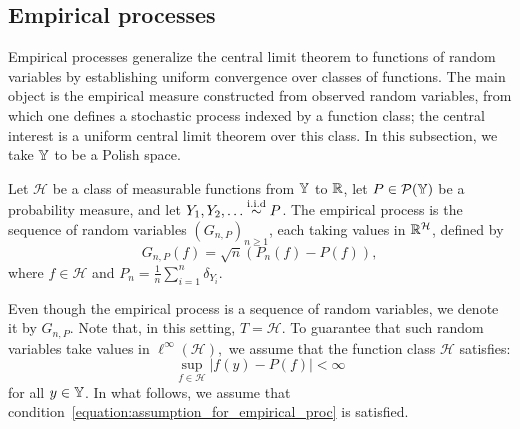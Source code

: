\subsection{Empirical processes} 
Empirical processes generalize the central limit theorem to functions of random variables by establishing uniform convergence over classes of functions. The main object is the empirical measure constructed from observed random variables, from which one defines a stochastic process indexed by a function class; the central interest is a uniform central limit theorem over this class. In this subsection, we take $\mathbb{Y}$ to be a Polish space.
\begin{definition}\label{definition::empirical_process}
Let $\mathcal{H}$ be a class of measurable functions from $\mathbb{Y}$ to $\mathbb{R}$, let $P\in \mathcal{P}(\mathbb{Y})$ be a probability measure, and let $Y_1,Y_2,\dots\overset{\mathrm{i.i.d}}{\sim}P$. The empirical process is the sequence of random variables $(G_{n,P})_{n\geq 1}$, each taking values in $\mathbb{R}^\mathcal{H}$, defined by
\[
G_{n,P}(f) = \sqrt{n}(P_n(f) - P(f)),
\]
where $f \in \mathcal{H}$ and $P_n =\frac{1}{n}\sum_{i = 1}^n\delta_{Y_i}$.
\end{definition}
Even though the empirical process is a sequence of random variables, we denote it by $G_{n,P}$. Note that, in this setting, $T = \mathcal{H}.$ To guarantee that such random variables take values in $\ell^\infty(\mathcal{H}),$ we assume that the function class $\mathcal{H}$ satisfies:
\begin{equation}\label{equation:assumption_for_empirical_proc}
\sup_{f\in\mathcal{H}} \left|f(y) - P(f) \right| < \infty
\end{equation}
for all $y \in \mathbb{Y}$. In what follows, we assume that condition~\eqref{equation:assumption_for_empirical_proc} is satisfied.

